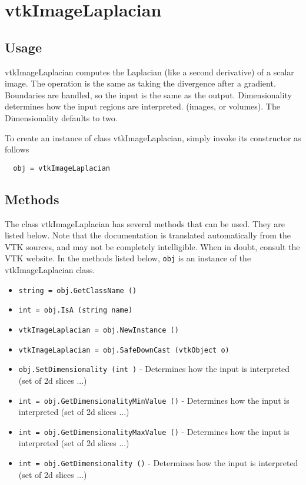 \section{vtkImageLaplacian}

\subsection{Usage}

 vtkImageLaplacian computes the Laplacian (like a second derivative)
 of a scalar image.  The operation is the same as taking the
 divergence after a gradient.  Boundaries are handled, so the input
 is the same as the output.
 Dimensionality determines how the input regions are interpreted.
 (images, or volumes). The Dimensionality defaults to two.

To create an instance of class vtkImageLaplacian, simply
invoke its constructor as follows
\begin{verbatim}
  obj = vtkImageLaplacian
\end{verbatim}
\subsection{Methods}

The class vtkImageLaplacian has several methods that can be used.
  They are listed below.
Note that the documentation is translated automatically from the VTK sources,
and may not be completely intelligible.  When in doubt, consult the VTK website.
In the methods listed below, \verb|obj| is an instance of the vtkImageLaplacian class.
\begin{itemize}
\item  \verb|string = obj.GetClassName ()|

\item  \verb|int = obj.IsA (string name)|

\item  \verb|vtkImageLaplacian = obj.NewInstance ()|

\item  \verb|vtkImageLaplacian = obj.SafeDownCast (vtkObject o)|

\item  \verb|obj.SetDimensionality (int )| -  Determines how the input is interpreted (set of 2d slices ...)

\item  \verb|int = obj.GetDimensionalityMinValue ()| -  Determines how the input is interpreted (set of 2d slices ...)

\item  \verb|int = obj.GetDimensionalityMaxValue ()| -  Determines how the input is interpreted (set of 2d slices ...)

\item  \verb|int = obj.GetDimensionality ()| -  Determines how the input is interpreted (set of 2d slices ...)

\end{itemize}
